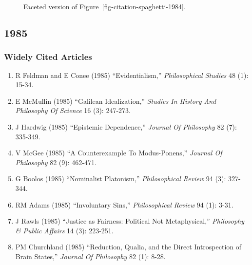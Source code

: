 \documentclass[
  10pt,
  letterpaper,
  DIV=11,
  numbers=noendperiod,
  twoside]{scrartcl}
\providecommand{\tightlist}{%
  \setlength{\itemsep}{0pt}\setlength{\parskip}{0pt}}\usepackage{longtable,booktabs,array}
\begin{document}
\begin{figure}


\caption{\label{fig-citation-facet-1984}Faceted version of
Figure~\ref{fig-citation-spaghetti-1984}.}

\end{figure}%

\newpage

\subsection{1985}\label{sec-s1985}

\subsubsection*{Widely Cited Articles}\label{widely-cited-articles-29}

\begin{enumerate}
\def\labelenumi{\arabic{enumi}.}
\tightlist
\item
  R Feldman and E Conee (1985) ``Evidentialism,'' \emph{Philosophical
  Studies} 48 (1): 15-34.
\item
  E McMullin (1985) ``Galilean Idealization,'' \emph{Studies In History
  And Philosophy Of Science} 16 (3): 247-273.
\item
  J Hardwig (1985) ``Epistemic Dependence,'' \emph{Journal Of
  Philosophy} 82 (7): 335-349.
\item
  V McGee (1985) ``A Counterexample To Modus-Ponens,'' \emph{Journal Of
  Philosophy} 82 (9): 462-471.
\item
  G Boolos (1985) ``Nominalist Platonism,'' \emph{Philosophical Review}
  94 (3): 327-344.
\item
  RM Adams (1985) ``Involuntary Sins,'' \emph{Philosophical Review} 94
  (1): 3-31.
\item
  J Rawls (1985) ``Justice as Fairness: Political Not Metaphysical,''
  \emph{Philosophy \& Public Affairs} 14 (3): 223-251.
\item
  PM Churchland (1985) ``Reduction, Qualia, and the Direct Introspection
  of Brain States,'' \emph{Journal Of Philosophy} 82 (1): 8-28.
\end{enumerate}
\end{document}
